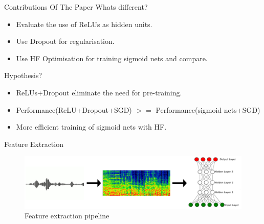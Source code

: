 \documentclass{beamer}
\begin{document}
\begin{frame}{Contributions Of The Paper}
{ Whats different?}
\begin{itemize}
    \item Evaluate the use of ReLUs as hidden units.
    \item Use Dropout for regularisation.
    \item Use HF Optimisation for training sigmoid nets and compare. 
  \end{itemize}
{ Hypothesis?}
\begin{itemize}
    \item ReLUs+Dropout eliminate the need for pre-training.
    \item Performance(ReLU+Dropout+SGD) $>=$ Performance(sigmoid nets+SGD)
    \item More efficient training of sigmoid nets with HF.
  \end{itemize}
\end{frame}

\begin{frame}{Feature Extraction}
\begin{figure}
\begin{center}  
  \includegraphics[scale=0.4]{Figures/feats.eps}
\end{center}
\caption{Feature extraction pipeline}
\end{figure}
\end{frame}
\end{document}
